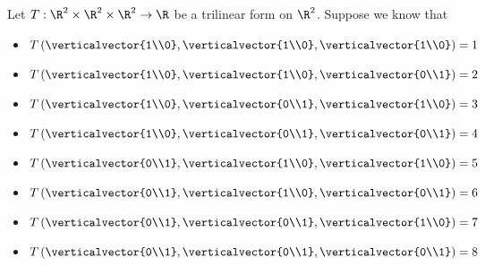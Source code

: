 \documentclass{ximera}
\begin{document}
	\begin{question}
		Let $T:\R^2\times \R^2 \times \R^2 \to \R$ be a trilinear form on $\R^2$.  Suppose we know that
			\begin{itemize}
				\item $T\left( \verticalvector{1\\0},\verticalvector{1\\0},\verticalvector{1\\0}\right) = 1$
				\item $T\left( \verticalvector{1\\0},\verticalvector{1\\0},\verticalvector{0\\1}\right) = 2$
				\item $T\left( \verticalvector{1\\0},\verticalvector{0\\1},\verticalvector{1\\0}\right) = 3$
				\item $T\left( \verticalvector{1\\0},\verticalvector{0\\1},\verticalvector{0\\1}\right) = 4$
				\item $T\left( \verticalvector{0\\1},\verticalvector{1\\0},\verticalvector{1\\0}\right) = 5$
				\item $T\left( \verticalvector{0\\1},\verticalvector{1\\0},\verticalvector{0\\1}\right) = 6$
				\item $T\left( \verticalvector{0\\1},\verticalvector{0\\1},\verticalvector{1\\0}\right) = 7$
				\item $T\left( \verticalvector{0\\1},\verticalvector{0\\1},\verticalvector{0\\1}\right) = 8$
			\end{itemize}
			

\end{question}
\end{document}
